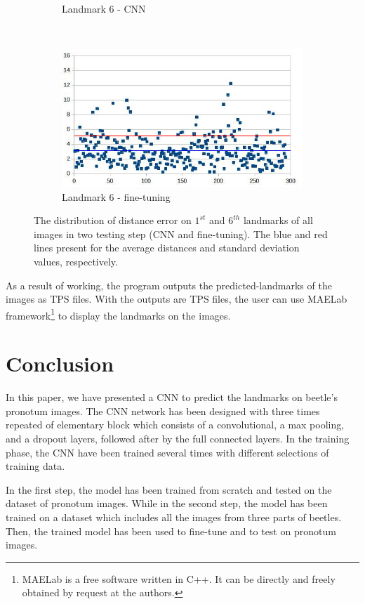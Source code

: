\documentclass[10pt]{article}
\begin{document}
\begin{figure}[htbp]
\begin{subfigure}[t]{0.25\textwidth}
        \caption{\small{Landmark 6 - CNN}}
        \label{figsub111}
    \end{subfigure}%
    ~ 
    \begin{subfigure}[t]{0.25\textwidth}
        \centering
        \includegraphics[scale=.32]{images/lm6_finetuning_2}
        \caption{\small{Landmark 6 - fine-tuning}}
        \label{figsub222}
    \end{subfigure}
    \caption{\small{The distribution of distance error on $1^{st}$ and $6^{th}$ landmarks of all images in two testing step (CNN and fine-tuning). The blue and red lines present for the average distances and standard deviation values, respectively.}}
    \label{figrsexample2}
\end{figure}

As a result of working, the program outputs the
predicted-landmarks of the images as TPS files. With the outputs are TPS files,
the user can use MAELab framework\footnote{MAELab is a free software written in C++. It can be directly and freely
obtained by request at the authors.} to display the
landmarks on the images.
\section{Conclusion}
In this paper, we have presented a CNN to predict the landmarks on beetle's pronotum images. The CNN network has been designed with three times repeated of elementary block which consists of a convolutional, a max pooling, and a dropout layers, followed after by the full connected layers. In the training phase, the CNN have been trained several times with different selections of training data.

In the first step, the model has been trained from scratch and tested on the dataset of pronotum images. While in the second step, the model has been trained on a dataset which includes all the images from three parts of beetles. Then, the trained model has been used to fine-tune and to test on pronotum images.
\end{document}
